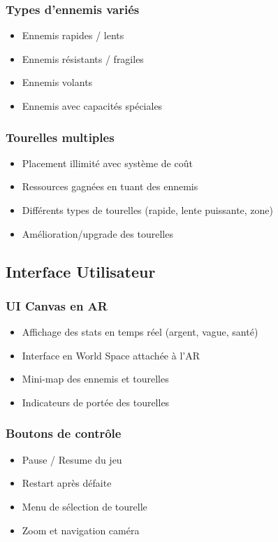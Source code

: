 \documentclass[12pt,a4paper]{article}
\begin{document}
\subsubsection{Types d'ennemis variés}
\begin{itemize}
    \item Ennemis rapides / lents
    \item Ennemis résistants / fragiles
    \item Ennemis volants
    \item Ennemis avec capacités spéciales
\end{itemize}

\subsubsection{Tourelles multiples}
\begin{itemize}
    \item Placement illimité avec système de coût
    \item Ressources gagnées en tuant des ennemis
    \item Différents types de tourelles (rapide, lente puissante, zone)
    \item Amélioration/upgrade des tourelles
\end{itemize}

\subsection{Interface Utilisateur}

\subsubsection{UI Canvas en AR}
\begin{itemize}
    \item Affichage des stats en temps réel (argent, vague, santé)
    \item Interface en World Space attachée à l'AR
    \item Mini-map des ennemis et tourelles
    \item Indicateurs de portée des tourelles
\end{itemize}

\subsubsection{Boutons de contrôle}
\begin{itemize}
    \item Pause / Resume du jeu
    \item Restart après défaite
    \item Menu de sélection de tourelle
    \item Zoom et navigation caméra
\end{itemize}
\end{document}
